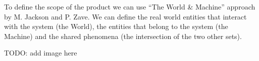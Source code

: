 To define the scope of the product we can use ``The World \& Machine'' approach by M. Jackson and P. Zave.
We can define the real world entities that interact with the system (the World), the entities that belong to the system (the Machine) and the shared phenomena (the intersection of the two other sets).

TODO: add image here

